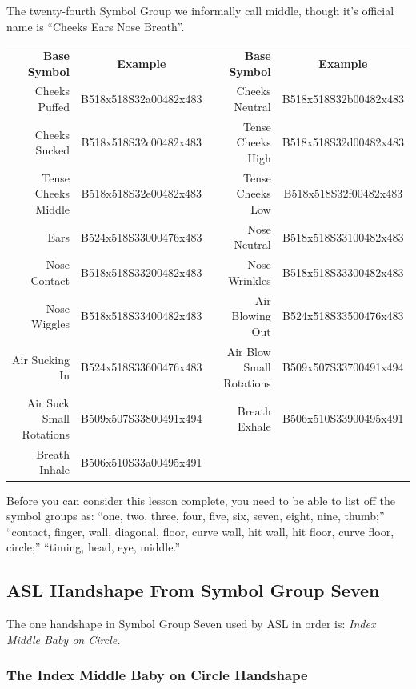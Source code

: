 \documentclass{article}
\begin{document}
The twenty-fourth Symbol Group we informally call middle, though it's official name is ``Cheeks Ears Nose Breath''.

\begin{center}
\begin{tabular}{rcrc}
\textbf{Base Symbol}&\textbf{Example}&\textbf{Base Symbol}&\textbf{Example}\\
Cheeks Puffed           &B518x518S32a00482x483&Cheeks Neutral          &B518x518S32b00482x483\\
Cheeks Sucked           &B518x518S32c00482x483&Tense Cheeks High       &B518x518S32d00482x483\\
Tense Cheeks Middle     &B518x518S32e00482x483&Tense Cheeks Low        &B518x518S32f00482x483\\
Ears                    &B524x518S33000476x483&Nose Neutral            &B518x518S33100482x483\\
Nose Contact            &B518x518S33200482x483&Nose Wrinkles           &B518x518S33300482x483\\
Nose Wiggles            &B518x518S33400482x483&Air Blowing Out         &B524x518S33500476x483\\
Air Sucking In          &B524x518S33600476x483&Air Blow Small Rotations&B509x507S33700491x494\\
Air Suck Small Rotations&B509x507S33800491x494&Breath Exhale           &B506x510S33900495x491\\
Breath Inhale           &B506x510S33a00495x491\\
\end{tabular}
\end{center}

Before you can consider this lesson complete, you need to be able to list off the symbol groups as:
``one, two, three, four, five, six, seven, eight, nine, thumb;''
``contact, finger, wall, diagonal, floor, curve wall, hit wall, hit floor, curve floor, circle;''
``timing, head, eye, middle.''

\subsection{ASL Handshape From Symbol Group Seven}

The one handshape in Symbol Group Seven used by ASL in order is:
{\it
Index Middle Baby on Circle.
}

\subsubsection{The Index Middle Baby on Circle Handshape}
\end{document}
